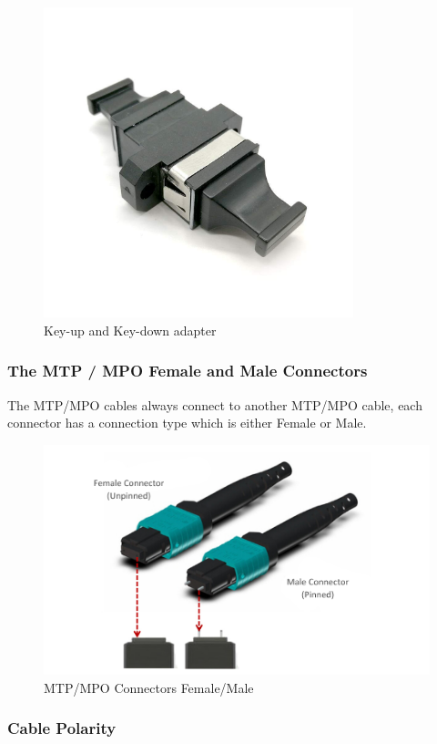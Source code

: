 \begin{figure}
  \includegraphics[width=9cm]{images/4.jpg}
  \centering
  \caption{Key-up and Key-down adapter}
  \label{fig:jlsimon}
\end{figure}

\subsubsection{The MTP / MPO Female and Male Connectors}

  The MTP/MPO cables always connect to another MTP/MPO cable, each connector has a connection type which is either Female or Male.

\begin{figure}
  \includegraphics[width=\textwidth]{images/5.jpeg}
  \caption{MTP/MPO Connectors Female/Male}
  \label{fig:jlsimon}
\end{figure}


\subsubsection{Cable Polarity}

